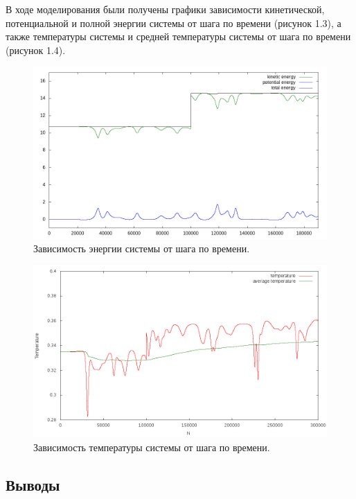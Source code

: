 \documentclass[14pt,a4paper,report]{ncc}
\begin{document}
В ходе моделирования были получены графики зависимости кинетической, потенциальной и полной энергии системы от шага по времени (рисунок 1.3), а также температуры системы и средней температуры системы от шага по времени (рисунок 1.4).
\
\begin{figure}
\includegraphics[scale=0.66]{plot_energy}
\caption{Зависимость энергии системы от шага по времени.}
\end{figure}

\begin{figure}
\includegraphics[scale=0.66]{plot_temperature}
\caption{Зависимость температуры системы от шага по времени.}
\end{figure}


\subsection{Выводы}
\end{document}
